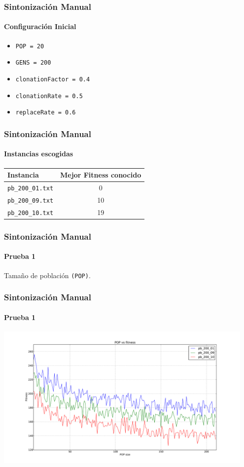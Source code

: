 \frame
{
\frametitle{Sintonización Manual}
\framesubtitle{Configuración Inicial}
\begin{itemize}
    \item \texttt{POP = 20}
    \item \texttt{GENS = 200}
    \item \texttt{clonationFactor = 0.4}
    \item \texttt{clonationRate = 0.5}
    \item \texttt{replaceRate = 0.6}
\end{itemize}

}

\frame
{
\frametitle{Sintonización Manual}
\framesubtitle{Instancias escogidas}
\begin{center}
    \begin{tabular}{|l|c|}
    \hline
    \textbf{Instancia} & \textbf{Mejor Fitness conocido} \\\hline
    \texttt{pb\_200\_01.txt} & 0 \\\hline
    \texttt{pb\_200\_09.txt} & 10 \\\hline
    \texttt{pb\_200\_10.txt} & 19 \\\hline
    \end{tabular}
\end{center}
}

\frame
{
\frametitle{Sintonización Manual}
\framesubtitle{Prueba 1}
\vspace{1cm}
\begin{center}
	Tamaño de población \texttt{(POP)}.\\
\end{center}
}

\frame
{
\frametitle{Sintonización Manual}
\framesubtitle{Prueba 1}
\begin{center}
	\includegraphics[width=0.95\textwidth]{../doc/img/1.pdf}
\end{center}
}

